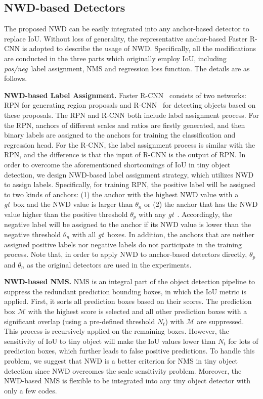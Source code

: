 \documentclass{article}
\newcommand{\gt}{\textit{gt}~}
\newcommand{\posneg}{\textit{pos/neg}~}
\begin{document}
\subsection{NWD-based Detectors}

The proposed NWD can be easily integrated into any anchor-based detector to replace IoU. Without loss of generality, the representative anchor-based Faster R-CNN is adopted to describe the usage of NWD. Specifically, all the modifications are conducted in the three parts which originally employ IoU, including \posneg label assignment, NMS and regression loss function. The details are as follows.

\textbf{NWD-based Label Assignment.} Faster R-CNN~\cite{Faster-R-CNN_2015_NIPS} consists of two networks: RPN for generating region proposals and R-CNN~\cite{Fast-R-CNN_2015_ICCV} for detecting objects based on these proposals. The RPN and R-CNN both include label assignment process. For the RPN, anchors of different scales and ratios are firstly generated, and then binary labels are assigned to the anchors for training the classification and regression head. For the R-CNN, the label assignment process is similar with the RPN, and the difference is that the input of R-CNN is the output of RPN. In order to overcome the aforementioned shortcomings of IoU in tiny object detection, we design NWD-based label assignment strategy, which utilizes NWD to assign labels. Specifically, for training RPN, the positive label will be assigned to two kinds of anchors: (1) the anchor with the highest NWD value with a \gt box and the NWD value is larger than $\theta_{n}$ or (2) the anchor that has the NWD value higher than the positive threshold $\theta_{p}$ with any \gt. Accordingly, the negative label will be assigned to the anchor if its NWD value is lower than the negative threshold $\theta_{n}$ with all \gt boxes. In addition, the anchors that are neither assigned positive labels nor negative labels do not participate in the training process. Note that, in order to apply NWD to anchor-based detectors directly, $\theta_{p}$ and $\theta_{n}$ as the original detectors are used in the experiments.

\textbf{NWD-based NMS.} NMS is an integral part of the object detection pipeline to suppress the redundant prediction bounding boxes, in which the IoU metric is applied. First, it sorts all prediction boxes based on their scores. The prediction box $\mathcal{M}$ with the highest score is selected and all other prediction boxes with a significant overlap (using a pre-defined threshold $N_{t}$) with $\mathcal{M}$ are suppressed. This process is recursively applied on the remaining boxes. However, the sensitivity of IoU to tiny object will make the IoU values lower than $N_{t}$ for lots of prediction boxes, which further leads to false positive predictions. To handle this problem, we suggest that NWD is a better criterion for NMS in tiny object detection since NWD overcomes the scale sensitivity problem. Moreover, the NWD-based NMS is flexible to be integrated into any tiny object detector with only a few codes.
\end{document}
